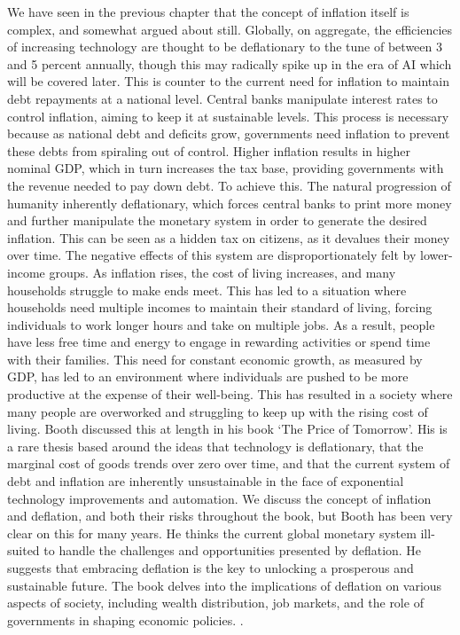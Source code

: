 We have seen in the previous chapter that the concept of inflation itself is complex, and somewhat argued about still. Globally, on aggregate, the efficiencies of increasing technology are thought to be deflationary to the tune of between 3 and 5 percent annually, though this may radically spike up in the era of AI which will be covered later. This is counter to the current need for inflation to maintain debt repayments at a national level. Central banks manipulate interest rates to control inflation, aiming to keep it at sustainable levels. This process is necessary because as national debt and deficits grow, governments need inflation to prevent these debts from spiraling out of control. Higher inflation results in higher nominal GDP, which in turn increases the tax base, providing governments with the revenue needed to pay down debt. To achieve this. The natural progression of humanity inherently deflationary, which forces central banks to print more money and further manipulate the monetary system in order to generate the desired inflation. This can be seen as a hidden tax on citizens, as it devalues their money over time. The negative effects of this system are disproportionately felt by lower-income groups. As inflation rises, the cost of living increases, and many households struggle to make ends meet. This has led to a situation where households need multiple incomes to maintain their standard of living, forcing individuals to work longer hours and take on multiple jobs. As a result, people have less free time and energy to engage in rewarding activities or spend time with their families. This need for constant economic growth, as measured by GDP, has led to an environment where individuals are pushed to be more productive at the expense of their well-being. This has resulted in a society where many people are overworked and struggling to keep up with the rising cost of living. Booth discussed this at length in his book `The Price of Tomorrow'. His is a rare thesis based around the ideas that technology is deflationary, that the marginal cost of goods trends over zero over time, and that the current system of debt and inflation are inherently unsustainable in the face of exponential technology improvements and automation. We discuss the concept of inflation and deflation, and both their risks throughout the book, but Booth has been very clear on this for many years. He thinks the current global monetary system ill-suited to handle the challenges and opportunities presented by deflation. He suggests that embracing deflation is the key to unlocking a prosperous and sustainable future. The book delves into the implications of deflation on various aspects of society, including wealth distribution, job markets, and the role of governments in shaping economic policies. \cite{booth2020price}.\par
